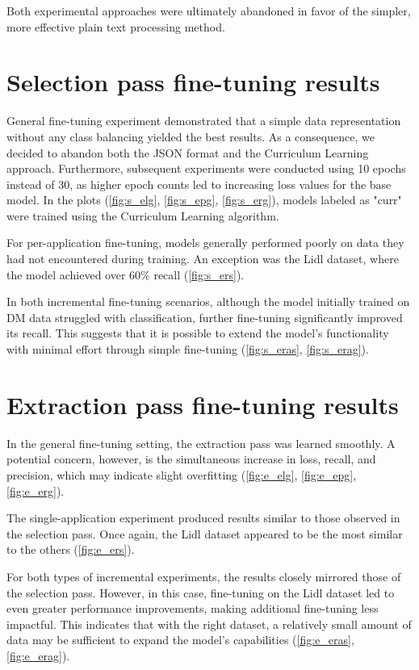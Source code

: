 \documentclass[licencjacka,en]{pracamgr}
\begin{document}
Both experimental approaches were ultimately abandoned in favor of the simpler, more effective plain text processing method.

\section{Selection pass fine-tuning results}
General fine-tuning experiment demonstrated that a simple data representation without any class balancing yielded the best results. As a consequence, we decided to abandon both the JSON format and the Curriculum Learning approach. Furthermore, subsequent experiments were conducted using 10 epochs instead of 30, as higher epoch counts led to increasing loss values for the base model. In the plots (\ref{fig:s_elg}, \ref{fig:s_epg}, \ref{fig:s_erg}), models labeled as "curr" were trained using the Curriculum Learning algorithm.

For per-application fine-tuning, models generally performed poorly on data they had not encountered during training. An exception was the Lidl dataset, where the model achieved over 60\% recall (\ref{fig:s_ers}).

In both incremental fine-tuning scenarios, although the model initially trained on DM data struggled with classification, further fine-tuning significantly improved its recall. This suggests that it is possible to extend the model's functionality with minimal effort through simple fine-tuning (\ref{fig:s_eras}, \ref{fig:s_erag}).

\section{Extraction pass fine-tuning results}
In the general fine-tuning setting, the extraction pass was learned smoothly. A potential concern, however, is the simultaneous increase in loss, recall, and precision, which may indicate slight overfitting (\ref{fig:e_elg}, \ref{fig:e_epg}, \ref{fig:e_erg}).

The single-application experiment produced results similar to those observed in the selection pass. Once again, the Lidl dataset appeared to be the most similar to the others (\ref{fig:e_ers}).

For both types of incremental experiments, the results closely mirrored those of the selection pass. However, in this case, fine-tuning on the Lidl dataset led to even greater performance improvements, making additional fine-tuning less impactful. This indicates that with the right dataset, a relatively small amount of data may be sufficient to expand the model’s capabilities (\ref{fig:e_eras}, \ref{fig:e_erag}).
\end{document}
